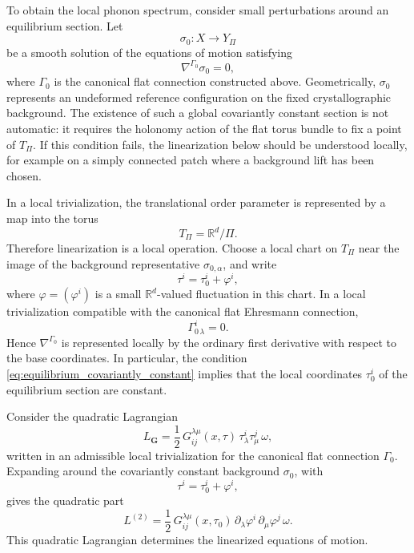 \documentclass[11pt]{amsart}
\theoremstyle{plain}
\theoremstyle{definition}
\theoremstyle{remark}
\begin{document}
To obtain the local phonon spectrum, consider small perturbations around an equilibrium section. Let
\begin{equation}
	\sigma_0:X\to Y_\Pi
	\label{eq:equilibrium_section}
\end{equation}
be a smooth solution of the equations of motion satisfying
\begin{equation}
	\nabla^{\Gamma_0}\sigma_0=0,
	\label{eq:equilibrium_covariantly_constant}
\end{equation}
where \(\Gamma_0\) is the canonical flat connection constructed above. 
Geometrically, \(\sigma_0\) represents an undeformed reference configuration on the fixed crystallographic background. 
The existence of such a global covariantly constant section is not automatic: it requires the holonomy action of the flat torus bundle to fix a point of \(T_\Pi\). 
If this condition fails, the linearization below should be understood locally, for example on a simply connected patch where a background lift has been chosen.

In a local trivialization, the translational order parameter is represented by a map into the torus
\[
T_\Pi=\mathbb R^d/\Pi.
\]
Therefore linearization is a local operation. 
Choose a local chart on \(T_\Pi\) near the image of the background representative \(\sigma_{0,\alpha}\), and write
\begin{equation}
	\tau^i=\tau_0^i+\varphi^i,
	\label{eq:small_fluctuation}
\end{equation}
where \(\varphi=(\varphi^i)\) is a small \(\mathbb R^d\)-valued fluctuation in this chart. 
In a local trivialization compatible with the canonical flat Ehresmann connection,
\[
\Gamma^i_{0\,\lambda}=0.
\]
Hence \(\nabla^{\Gamma_0}\) is represented locally by the ordinary first derivative with respect to the base coordinates. 
In particular, the condition \eqref{eq:equilibrium_covariantly_constant} implies that the local coordinates \(\tau_0^i\) of the equilibrium section are constant.

\medskip

Consider the quadratic Lagrangian
\begin{equation}
	L_{\mathbf G}
	=
	\frac12\,G^{\lambda\mu}_{ij}(x,\tau)\,
	\tau^i_\lambda\tau^j_\mu\,\omega,
	\label{eq:quadratic_lagrangian_for_linearization}
\end{equation}
written in an admissible local trivialization for the canonical flat connection \(\Gamma_0\). 
Expanding around the covariantly constant background \(\sigma_0\), with
\[
\tau^i=\tau_0^i+\varphi^i,
\]
gives the quadratic part
\begin{equation}
	L^{(2)}
	=
	\frac12\,G^{\lambda\mu}_{ij}(x,\tau_0)\,
	\partial_\lambda\varphi^i\,\partial_\mu\varphi^j\,\omega.
	\label{eq:linearized_lagrangian_general}
\end{equation}
This quadratic Lagrangian determines the linearized equations of motion.
\end{document}
